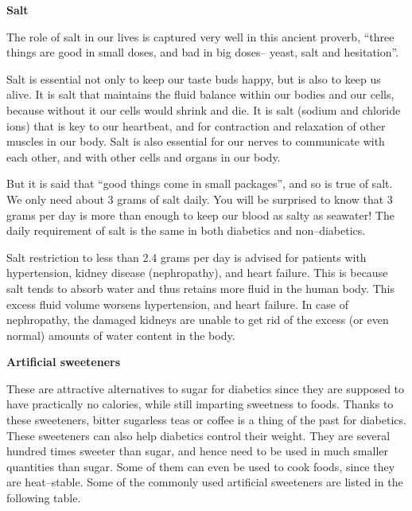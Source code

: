 \noindent\textbf{Salt}

The role of salt in our lives is captured very well in this ancient proverb, “three things are good in small doses, and bad in big doses– yeast, salt and hesitation”.

Salt is essential not only to keep our taste buds happy, but is also to keep us alive. It is salt that maintains the fluid balance within our bodies and our cells, because without it our cells would shrink and die. It is salt (sodium and chloride ions) that is key to our heartbeat, and for contraction and relaxation of other muscles in our body. Salt is also essential for our nerves to communicate with each other, and with other cells and organs in our body.

But it is said that “good things come in small packages”, and so is true of salt. We only need about 3 grams of salt daily. You will be surprised to know that 3 grams per day is more than enough to keep our blood as salty as seawater! The daily requirement of salt is the same in both diabetics and non–diabetics.

Salt restriction to less than 2.4 grams per day is advised for patients with hypertension, kidney disease (nephropathy), and heart failure. This is because salt tends to absorb water and thus retains more fluid in the human body. This excess fluid volume worsens hypertension, and heart failure. In case of nephropathy, the damaged kidneys are unable to get rid of the excess (or even normal) amounts of water content in the body.

\noindent\textbf{Artificial sweeteners}

These are attractive alternatives to sugar for diabetics since they are supposed to have practically no calories, while still imparting sweetness to foods. Thanks to these sweeteners, bitter sugarless teas or coffee is a thing of the past for diabetics. These sweeteners can also help diabetics control their weight. They are several hundred times sweeter than sugar, and hence need to be used in much smaller quantities than sugar. Some of them can even be used to cook foods, since they are heat–stable. Some of the commonly used artificial sweeteners are listed in the following table.


